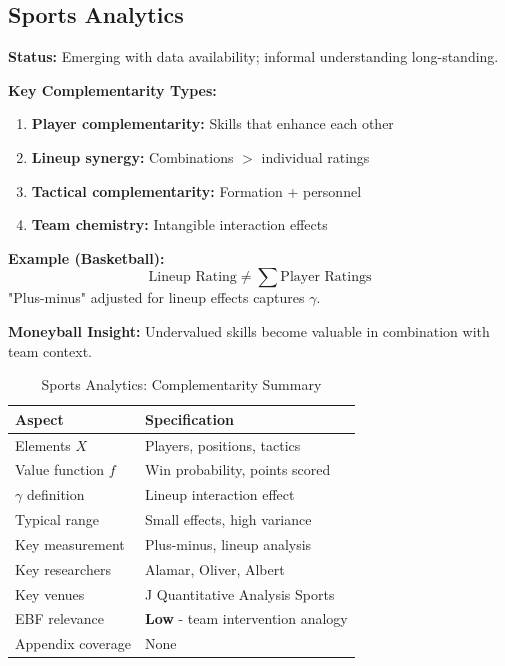 \subsection{Sports Analytics}
\label{sec:sports}

\begin{tcolorbox}[colback=green!5!white,colframe=green!75!black,title=\textbf{Sports Analytics: Team Chemistry and Player Complementarity}]

\textbf{Status:} Emerging with data availability; informal understanding long-standing.

\textbf{Key Complementarity Types:}
\begin{enumerate}[noitemsep]
    \item \textbf{Player complementarity:} Skills that enhance each other
    \item \textbf{Lineup synergy:} Combinations $>$ individual ratings
    \item \textbf{Tactical complementarity:} Formation + personnel
    \item \textbf{Team chemistry:} Intangible interaction effects
\end{enumerate}

\textbf{Example (Basketball):}
\begin{equation}
\text{Lineup Rating} \neq \sum \text{Player Ratings}
\end{equation}
"Plus-minus" adjusted for lineup effects captures $\gamma$.

\textbf{Moneyball Insight:}
Undervalued skills become valuable in combination with team context.

\end{tcolorbox}

\begin{table}[h]
\centering
\caption{Sports Analytics: Complementarity Summary}
\label{tab:sports-summary}
\renewcommand{\arraystretch}{1.3}
\small
\begin{tabular}{@{}ll@{}}
\toprule
\textbf{Aspect} & \textbf{Specification} \\
\midrule
Elements $X$ & Players, positions, tactics \\
Value function $f$ & Win probability, points scored \\
$\gamma$ definition & Lineup interaction effect \\
Typical range & Small effects, high variance \\
Key measurement & Plus-minus, lineup analysis \\
Key researchers & Alamar, Oliver, Albert \\
Key venues & J Quantitative Analysis Sports \\
EBF relevance & \textbf{Low} - team intervention analogy \\
Appendix coverage & None \\
\bottomrule
\end{tabular}
\end{table}

